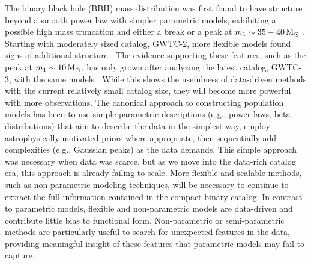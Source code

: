 The binary black hole (BBH) mass distribution was first found to have structure beyond a smooth power law with simpler parametric models, exhibiting a possible high mass truncation and either a break or a peak at $m_1\sim35-40\,{\rm M}_\odot$ \citep{Fishbach_2017,Talbot_2018,o1o2_pop,o3a_pop}. Starting with moderately sized catalog, GWTC-2, more flexible models found signs of additional structure \citep{Tiwari_2021_b,Edelman_2022ApJ}. The evidence supporting these features, 
such as the peak at $m_1\sim10\,{\rm M}_\odot$, has only grown after analyzing the latest catalog, GWTC-3, with the same models \citep{o3b_astro_dist,Tiwari_2022ApJ}. 
While this shows the usefulness of data-driven methods with the current relatively small catalog size, they will become more powerful with more observations. The canonical approach to constructing population models has been 
to use simple parametric descriptions (e.g., power laws, beta distributions) that aim to describe the data in the simplest way, employ astrophysically motivated priors where appropriate, then sequentially add 
complexities (e.g., Gaussian peaks) as the data demands. This simple approach was necessary when data was scarce, but as we move into the data-rich catalog era, this approach is already failing to scale.  More flexible and scalable methods, such as non-parametric modeling techniques, will be necessary to continue to extract the full information contained in the compact binary catalog. In contrast to parametric models, flexible and non-parametric models are data-driven and 
contribute little bias to functional form. Non-parametric or semi-parametric methods are particularly useful to search for unexpected features in the 
data, providing meaningful insight of these features that parametric models may fail to capture.

